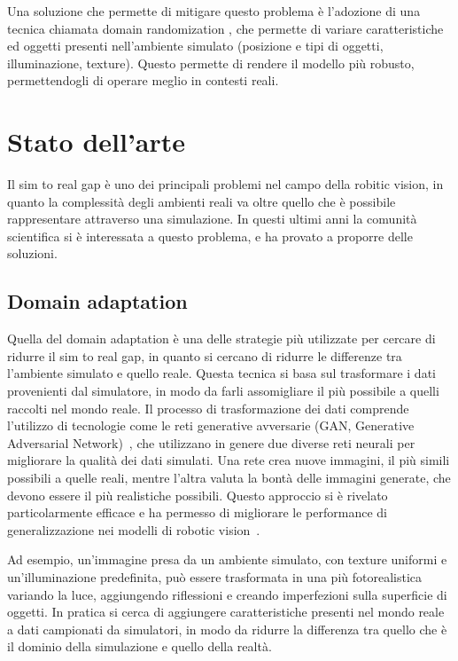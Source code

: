 \documentclass[12pt]{report}
\begin{document}
Una soluzione che permette di mitigare questo problema è l'adozione di una tecnica chiamata domain randomization , che permette di variare caratteristiche ed oggetti presenti nell'ambiente simulato (posizione e tipi di oggetti, illuminazione, texture). Questo permette di rendere il modello più robusto, permettendogli di operare meglio in contesti reali.

\chapter{Stato dell'arte}
\label{chap:stato_arte}

Il sim to real gap è uno dei principali problemi nel campo della robitic vision, in quanto la complessità degli ambienti reali va oltre quello che è possibile rappresentare attraverso una simulazione. In questi ultimi anni la comunità scientifica si è interessata a questo problema, e ha provato a proporre delle soluzioni.

\section{Domain adaptation}
\label{sec:adaptation}

Quella del domain adaptation è una delle strategie più utilizzate per cercare di ridurre il sim to real gap, in quanto si cercano di ridurre le differenze tra l'ambiente simulato e quello reale. Questa tecnica si basa sul trasformare i dati provenienti dal simulatore, in modo da farli assomigliare il più possibile a quelli raccolti nel mondo reale. Il processo di trasformazione dei dati comprende l'utilizzo di tecnologie come le reti generative avversarie (GAN, Generative Adversarial Network)~\cite{10.1145/3422622}, che utilizzano in genere due diverse reti neurali per migliorare la qualità dei dati simulati. Una rete crea nuove immagini, il più simili possibili a quelle reali, mentre l'altra valuta la bontà delle immagini generate, che devono essere il più realistiche possibili. Questo approccio si è rivelato particolarmente efficace e ha permesso di migliorare le performance di generalizzazione nei modelli di robotic vision~\cite{Shrivastava_2017_CVPR}.

Ad esempio, un'immagine presa da un ambiente simulato, con texture uniformi e un'illuminazione predefinita, può essere trasformata in una più fotorealistica variando la luce, aggiungendo riflessioni e creando imperfezioni sulla superficie di oggetti. In pratica si cerca di aggiungere caratteristiche presenti nel mondo reale a dati campionati da simulatori, in modo da ridurre la differenza tra quello che è il dominio della simulazione e quello della realtà.
\end{document}
